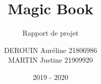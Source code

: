 \documentclass[report]{BetterDocument}
\title{Magic Book}
\subtitle{Rapport de projet}
\author{DEROUIN Auréline 21806986\\
	MARTIN Justine 21909920
}
\date{2019 - 2020}
\institute{Unicaen}
\begin{document}
	\pageDeGarde

	\tableDesMatieres

	

	

	

	

	

	

	
\end{document}
